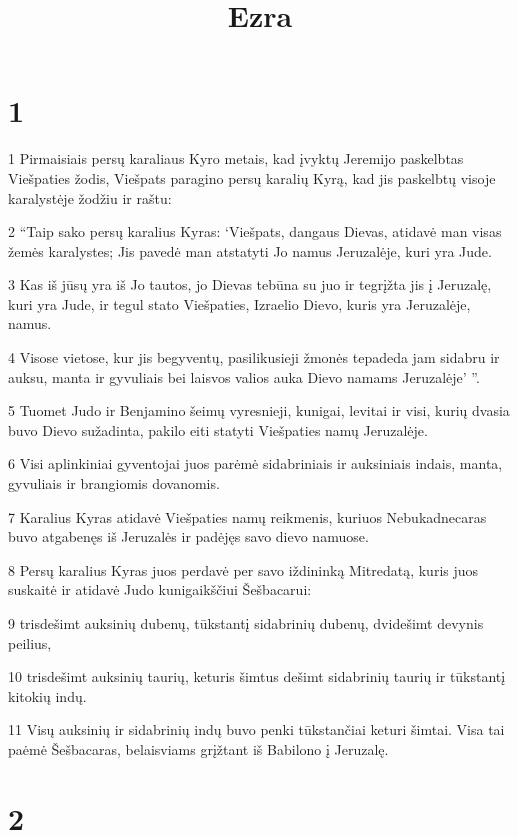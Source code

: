 

\title{Ezra}

\chapter{1}


\par 1 Pirmaisiais persų karaliaus Kyro metais, kad įvyktų Jeremijo paskelbtas Viešpaties žodis, Viešpats paragino persų karalių Kyrą, kad jis paskelbtų visoje karalystėje žodžiu ir raštu: 
\par 2 “Taip sako persų karalius Kyras: ‘Viešpats, dangaus Dievas, atidavė man visas žemės karalystes; Jis pavedė man atstatyti Jo namus Jeruzalėje, kuri yra Jude. 
\par 3 Kas iš jūsų yra iš Jo tautos, jo Dievas tebūna su juo ir tegrįžta jis į Jeruzalę, kuri yra Jude, ir tegul stato Viešpaties, Izraelio Dievo, kuris yra Jeruzalėje, namus. 
\par 4 Visose vietose, kur jis begyventų, pasilikusieji žmonės tepadeda jam sidabru ir auksu, manta ir gyvuliais bei laisvos valios auka Dievo namams Jeruzalėje’ ”. 
\par 5 Tuomet Judo ir Benjamino šeimų vyresnieji, kunigai, levitai ir visi, kurių dvasia buvo Dievo sužadinta, pakilo eiti statyti Viešpaties namų Jeruzalėje. 
\par 6 Visi aplinkiniai gyventojai juos parėmė sidabriniais ir auksiniais indais, manta, gyvuliais ir brangiomis dovanomis. 
\par 7 Karalius Kyras atidavė Viešpaties namų reikmenis, kuriuos Nebukadnecaras buvo atgabenęs iš Jeruzalės ir padėjęs savo dievo namuose. 
\par 8 Persų karalius Kyras juos perdavė per savo iždininką Mitredatą, kuris juos suskaitė ir atidavė Judo kunigaikščiui Šešbacarui: 
\par 9 trisdešimt auksinių dubenų, tūkstantį sidabrinių dubenų, dvidešimt devynis peilius, 
\par 10 trisdešimt auksinių taurių, keturis šimtus dešimt sidabrinių taurių ir tūkstantį kitokių indų. 
\par 11 Visų auksinių ir sidabrinių indų buvo penki tūkstančiai keturi šimtai. Visa tai paėmė Šešbacaras, belaisviams grįžtant iš Babilono į Jeruzalę.


\chapter{2}


